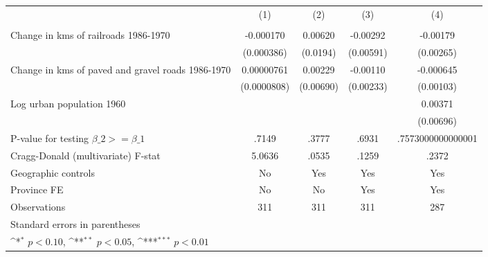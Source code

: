 {
\def\sym#1{\ifmmode^{#1}\else\(^{#1}\)\fi}
\begin{tabular}{l*{4}{c}}
\hline\hline
                &\multicolumn{1}{c}{(1)}&\multicolumn{1}{c}{(2)}&\multicolumn{1}{c}{(3)}&\multicolumn{1}{c}{(4)}\\
                &\multicolumn{1}{c}{}&\multicolumn{1}{c}{}&\multicolumn{1}{c}{}&\multicolumn{1}{c}{}\\
\hline
Change in kms of railroads 1986-1970&-0.000170         &  0.00620         & -0.00292         & -0.00179         \\
                &(0.000386)         & (0.0194)         &(0.00591)         &(0.00265)         \\
[1em]
Change in kms of paved and gravel roads 1986-1970&0.00000761         &  0.00229         & -0.00110         &-0.000645         \\
                &(0.0000808)         &(0.00690)         &(0.00233)         &(0.00103)         \\
[1em]
Log urban population 1960&                  &                  &                  &  0.00371         \\
                &                  &                  &                  &(0.00696)         \\
\hline
P-value for testing $\beta\_{2} >= \beta\_{1}$&    .7149         &    .3777         &    .6931         &.7573000000000001         \\
Cragg-Donald (multivariate) F-stat&   5.0636         &    .0535         &    .1259         &    .2372         \\
Geographic controls&       No         &      Yes         &      Yes         &      Yes         \\
Province FE     &       No         &       No         &      Yes         &      Yes         \\
Observations    &      311         &      311         &      311         &      287         \\
\hline\hline
\multicolumn{5}{l}{\footnotesize Standard errors in parentheses}\\
\multicolumn{5}{l}{\footnotesize \sym{*} \(p<0.10\), \sym{**} \(p<0.05\), \sym{***} \(p<0.01\)}\\
\end{tabular}
}
